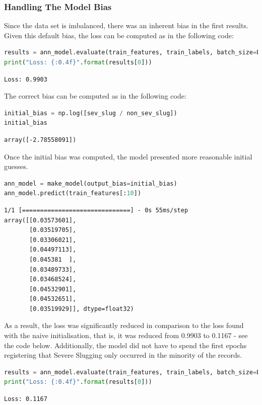 \documentclass{article}
\begin{document}
\subsubsection{Handling The Model Bias}
Since the data set is imbalanced, there was an inherent bias in the first results. Given this default bias, the loss can be computed as in the following code:

\begin{lstlisting}[language=Python]
results = ann_model.evaluate(train_features, train_labels, batch_size=BATCH_SIZE, verbose=0)
print("Loss: {:0.4f}".format(results[0]))
\end{lstlisting}
\begin{verbatim}
Loss: 0.9903
\end{verbatim}

The correct bias can be computed as in the following code:
\begin{lstlisting}[language=Python]
initial_bias = np.log([sev_slug / non_sev_slug]) 
initial_bias
\end{lstlisting}
\begin{verbatim}
array([-2.78558091])
\end{verbatim}

Once the initial bias was computed, the model presented more reasonable initial guesses.
\begin{lstlisting}[language=Python]
ann_model = make_model(output_bias=initial_bias)
ann_model.predict(train_features[:10])
\end{lstlisting}
\begin{verbatim}
1/1 [==============================] - 0s 55ms/step
array([[0.03573601],
       [0.03519705],
       [0.03306021],
       [0.04497113],
       [0.045381  ],
       [0.03489733],
       [0.03468524],
       [0.04532901],
       [0.04532651],
       [0.03519929]], dtype=float32)
\end{verbatim}

As a result, the loss was significantly reduced in comparison to the loss found with the naive initialisation, that is, it was reduced from 0.9903 to 0.1167 - see the code below. Additionally, the model did not have to spend the first epochs registering that Severe Slugging only occurred in the minority of the records.

\begin{lstlisting}[language=Python]
results = ann_model.evaluate(train_features, train_labels, batch_size=BATCH_SIZE, verbose=0)
print("Loss: {:0.4f}".format(results[0]))
\end{lstlisting}
\begin{verbatim}
Loss: 0.1167
\end{verbatim}
\end{document}
